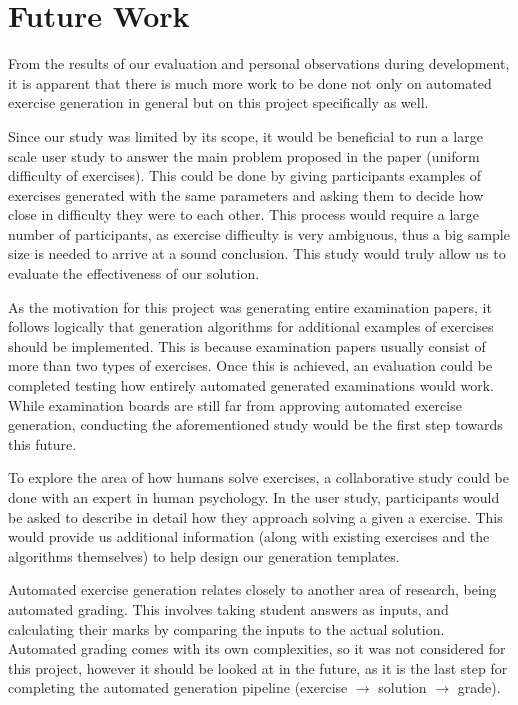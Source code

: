 \documentclass{l4proj}
\begin{document}
\section{Future Work}
\label{sec:future_work}

From the results of our evaluation and personal observations during development, it is apparent that there is much more work to be done not only on automated exercise generation in general but on this project specifically as well.

Since our study was limited by its scope, it would be beneficial to run a large scale user study to answer the main problem proposed in the paper (uniform difficulty of exercises). This could be done by giving participants examples of exercises generated with the same parameters and asking them to decide how close in difficulty they were to each other. This process would require a large number of participants, as exercise difficulty is very ambiguous, thus a big sample size is needed to arrive at a sound conclusion. This study would truly allow us to evaluate the effectiveness of our solution.

As the motivation for this project was generating entire examination papers, it follows logically that generation algorithms for additional examples of exercises should be implemented. This is because examination papers usually consist of more than two types of exercises. Once this is achieved, an evaluation could be completed testing how entirely automated generated examinations would work. While examination boards are still far from approving automated exercise generation, conducting the aforementioned study would be the first step towards this future.

To explore the area of how humans solve exercises, a collaborative study could be done with an expert in human psychology. In the user study, participants would be asked to describe in detail how they approach solving a given a exercise. This would provide us additional information (along with existing exercises and the algorithms themselves) to help design our generation templates.

Automated exercise generation relates closely to another area of research, being automated grading. This involves taking student answers as inputs, and calculating their marks by comparing the inputs to the actual solution. Automated grading comes with its own complexities, so it was not considered for this project, however it should be looked at in the future, as it is the last step for completing the automated generation pipeline (exercise $\rightarrow$ solution $\rightarrow$ grade).
\end{document}
